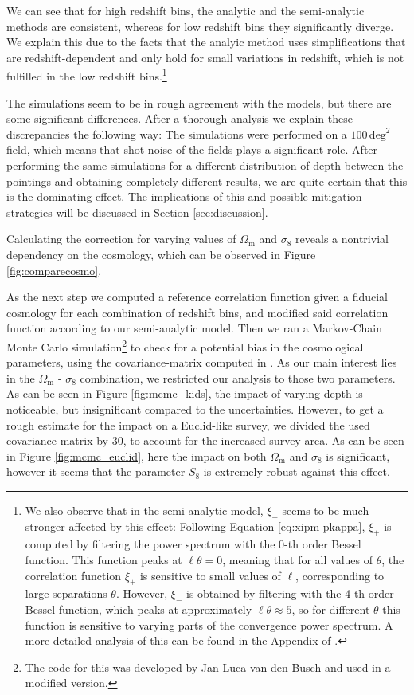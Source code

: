 \documentclass[referee]{aa} %
\renewcommand{\[}{\begin{equation}}
\renewcommand{\]}{\end{equation}}
\renewcommand{\rm}{\mathrm}
\begin{document}
We can see that for high redshift bins, the analytic and the semi-analytic methods are consistent, whereas for low redshift bins they significantly diverge. We explain this due to the facts that the analyic method uses simplifications that are redshift-dependent and only hold for small variations in redshift, which is not fulfilled in the low redshift bins.\footnote{We also observe that in the semi-analytic model, $\xi_-$ seems to be much stronger affected by this effect: Following Equation \eqref{eq:xipm-pkappa}, $\xi_+$ is computed by filtering the power spectrum with the 0-th order Bessel function. This function peaks at $\ell\theta=0$, meaning that for all values of $\theta$, the correlation function $\xi_+$ is sensitive to small values of $\ell$, corresponding to large separations $\theta$. However, $\xi_-$ is obtained by filtering with the 4-th order Bessel function, which peaks at approximately $\ell\theta\approx 5$, so for different $\theta$ this function is sensitive to varying parts of the convergence power spectrum. A more detailed analysis of this can be found in the Appendix of \citet{2017MNRAS.471.4412K}.}

The simulations seem to be in rough agreement with the models, but there are some significant differences. After a thorough analysis we explain these discrepancies the following way: The simulations were performed on a $100\,\rm{deg}^2$ field, which means that shot-noise of the fields plays a significant role. After performing the same simulations for a different distribution of depth between the pointings and obtaining completely different results, we are quite certain that this is the dominating effect. The implications of this and possible mitigation strategies will be discussed in Section \ref{sec:discussion}.

Calculating the correction for varying values of $\Omega_{\rm{m}}$ and $\sigma_8$ reveals a nontrivial dependency on the cosmology, which can be observed in Figure \ref{fig:comparecosmo}.

As the next step we computed a reference correlation function given a fiducial cosmology for each combination of redshift bins, and modified said correlation function according to our semi-analytic model. Then we ran a Markov-Chain Monte Carlo simulation\footnote{The code for this was developed by Jan-Luca van den Busch and used in a modified version.} to check for a potential bias in the cosmological parameters, using the covariance-matrix computed in \citet{2017MNRAS.465.1454H}. As our main interest lies in the $\Omega_{\rm m}$ - $\sigma_8$ combination, we restricted our analysis to those two parameters. As can be seen in Figure \ref{fig:mcmc_kids}, the impact of varying depth is noticeable, but insignificant compared to the uncertainties. However, to get a rough estimate for the impact on a Euclid-like survey, we divided the used covariance-matrix by 30, to account for the increased survey area. As can be seen in Figure \ref{fig:mcmc_euclid}, here the impact on both $\Omega_{\rm m}$ and $\sigma_8$ is significant, however it seems that the parameter $S_8$ is extremely robust against this effect.
\end{document}
